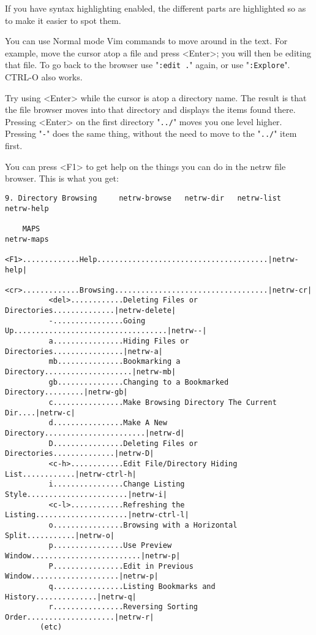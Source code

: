 If you have syntax highlighting enabled, the different parts are highlighted so as to make it easier to spot them.

You can use Normal mode Vim commands to move around in the text.
For example, move the cursor atop a file and press <Enter>; you will then be editing that file.
To go back to the browser use "\verb!:edit .!" again, or use "\verb!:Explore!".
CTRL-O also works.

Try using <Enter> while the cursor is atop a directory name.
The result is that the file browser moves into that directory and displays the items found there.
Pressing <Enter> on the first directory "\verb!../!" moves you one level higher.
Pressing "\verb!-!" does the same thing, without the need to move to the "\verb!../!" item first.

You can press <F1> to get help on the things you can do in the netrw file browser.
This is what you get:

\begin{Verbatim}[samepage=true]
    9. Directory Browsing     netrw-browse   netrw-dir   netrw-list   netrw-help 

    MAPS                                                                  netrw-maps 
          <F1>.............Help.......................................|netrw-help|
          <cr>.............Browsing...................................|netrw-cr|
          <del>............Deleting Files or Directories..............|netrw-delete|
          -................Going Up...................................|netrw--|
          a................Hiding Files or Directories................|netrw-a|
          mb...............Bookmarking a Directory....................|netrw-mb|
          gb...............Changing to a Bookmarked Directory.........|netrw-gb|
          c................Make Browsing Directory The Current Dir....|netrw-c|
          d................Make A New Directory.......................|netrw-d|
          D................Deleting Files or Directories..............|netrw-D|
          <c-h>............Edit File/Directory Hiding List............|netrw-ctrl-h|
          i................Change Listing Style.......................|netrw-i|
          <c-l>............Refreshing the Listing.....................|netrw-ctrl-l|
          o................Browsing with a Horizontal Split...........|netrw-o|
          p................Use Preview Window.........................|netrw-p|
          P................Edit in Previous Window....................|netrw-p|
          q................Listing Bookmarks and History..............|netrw-q|
          r................Reversing Sorting Order....................|netrw-r|
        (etc)
\end{Verbatim}

